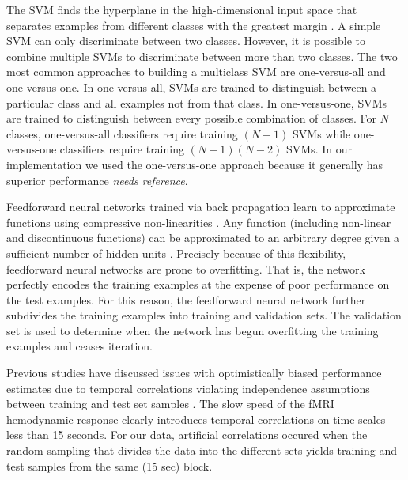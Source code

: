 \documentclass[preprint,5p,authoryear]{elsarticle}
\begin{document}
The SVM finds the hyperplane in the high-dimensional input space that separates examples from different classes with the greatest margin \citep{Cortes1995}.
A simple SVM can only discriminate between two classes.
However, it is possible to combine multiple SVMs to discriminate between more than two classes.
The two most common approaches to building a multiclass SVM are one-versus-all and one-versus-one.
In one-versus-all, SVMs are trained to distinguish between a particular class and all examples not from that class.
In one-versus-one, SVMs are trained to distinguish between every possible combination of classes.
For $N$ classes, one-versus-all classifiers require training $(N-1)$ SVMs while one-versus-one classifiers require training $(N-1)(N-2)$ SVMs.
In our implementation we used the one-versus-one approach because it generally has superior performance \emph{needs reference}.

Feedforward neural networks trained via back propagation learn to approximate functions using compressive non-linearities \citep{Hagan1994}.
Any function (including non-linear and discontinuous functions) can be approximated to an arbitrary degree given a sufficient number of hidden units \citep{Hornik1989}.
Precisely because of this flexibility, feedforward neural networks are prone to overfitting.
That is, the network perfectly encodes the training examples at the expense of poor performance on the test examples.
For this reason, the feedforward neural network further subdivides the training examples into training and validation sets.
The validation set is used to determine when the network has begun overfitting the training examples and ceases iteration.

Previous studies have discussed issues with optimistically biased performance estimates due to temporal correlations violating independence assumptions between training and test set samples \citep{Pereira2009}. The slow speed of the fMRI hemodynamic response clearly introduces temporal correlations on time scales less than 15 seconds.
For our data, artificial correlations occured when the random sampling that divides the data into the different sets yields training and test samples from the same (15 sec) block.
\end{document}
